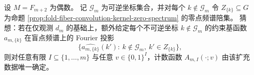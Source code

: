 \begin{conjecture}[偶模长下的最小补充观测与完全重建]\label{conj:fold-fiber-minimal-extra-observation-reconstruction}
设 \(M=F_{m+2}\) 为偶数。
记 \(\mathcal G_m\) 为可逆坐标集合，并对每个 \(k\notin\mathcal G_m\) 令 \(Z_{\{k\}}\subseteq G\) 为命题 \ref{prop:fold-fiber-convolution-kernel-zero-spectrum} 的零点频谱陪集。
猜想：若在仅观测 \(d_m\) 的基础上，额外给定每个不可逆坐标 \(k\notin\mathcal G_m\) 的约束基函数 \(a_{m,\{k\}}\) 在盲点频谱上的 Fourier 投影
\[
\bigl\{\widehat{a_{m,\{k\}}}(k'):\ k\notin\mathcal G_m,\ k'\in Z_{\{k\}}\bigr\},
\]
则对任意有限 \(I\subseteq\{1,\dots,m\}\) 与任意 \(v\in\{0,1\}^I\)，计数函数 \(A_{m,I}(\cdot;v)\) 由该扩充数据唯一确定。
\end{conjecture}

